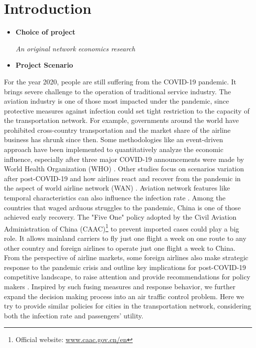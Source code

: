 \documentclass[11pt,twocolumn]{article}
\begin{document}
\section{Introduction}

\begin{itemize}
    \item \textbf{Choice of project}
    
    \emph{An original network economics research}

    \item \textbf{Project Scenario}
\end{itemize}

For the year 2020, people are still suffering from the COVID-19 pandemic. It brings severe challenge to the operation of traditional service industry. The aviation industry is one of those most impacted under the pandemic, since protective measures against infection could set tight restriction to the capacity of the transportation network. For example, governments around the world have prohibited cross-country transportation and the market share of the airline business has shrunk since then. Some methodologies like an event-driven approach have been implemented to quantitatively analyze the economic influence, especially after three major COVID-19 announcements were made by World Health Organization (WHO) \cite{maneenop2020impacts}. Other studies focus on scenarios variation after post-COVID-19 and how airlines react and recover from the pandemic in the aspect of world airline network (WAN) \cite{ye2020scenarios}. Aviation network features like temporal characteristics can also influence the infection rate \cite{scire2017}. Among the countries that waged arduous struggles to the pandemic, China is one of those achieved early recovery. The "Five One" policy adopted by the Civil Aviation Administration of China (CAAC)\footnote{Official website: \url{www.caac.gov.cn/en}} to prevent imported cases could play a big role. It allows mainland carriers to fly just one flight a week on one route to any other country and foreign airlines to operate just one flight a week to China. From the perspective of airline markets, some foreign airlines also make strategic response to the pandemic crisis and outline key implications for post-COVID-19 competitive landscape, to raise attention and provide recommendations for policy makers \cite{albers2020european} \cite{budd2020european}. Inspired by such fusing measures and response behavior, we further expand the decision making process into an air traffic control problem. Here we try to provide similar policies for cities in the transportation network, considering both the infection rate and passengers' utility.
\end{document}
